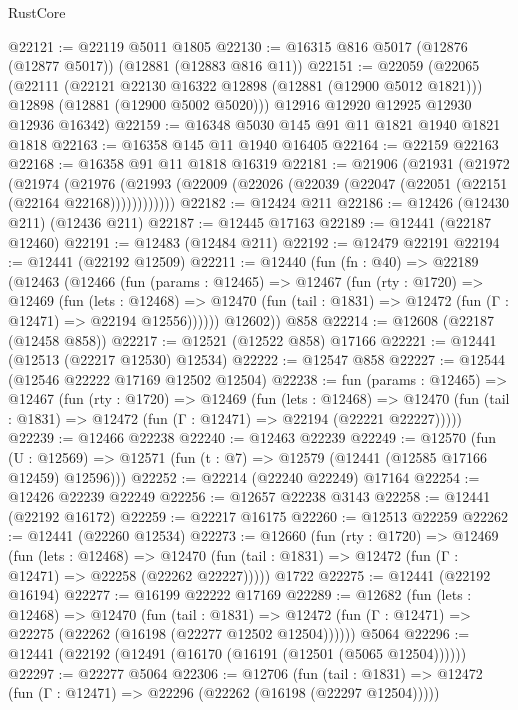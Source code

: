 \begin{lexlean}{RustCore}
\begin{coremodule}
@22121 := @22119 @5011 @1805
@22130 := @16315 @816 @5017 (@12876 (@12877 @5017)) (@12881 (@12883 @816 @11))
@22151 := @22059
    (@22065
      (@22111
        (@22121 @22130 @16322 @12898 (@12881 (@12900 @5012 @1821)))
        @12898
        (@12881 (@12900 @5002 @5020)))
      @12916
      @12920
      @12925
      @12930
      @12936
      @16342)
@22159 := @16348 @5030 @145 @91 @11 @1821 @1940 @1821 @1818
@22163 := @16358 @145 @11 @1940 @16405
@22164 := @22159 @22163
@22168 := @16358 @91 @11 @1818 @16319
@22181 := @21906
    (@21931
      (@21972
        (@21974
          (@21976 (@21993 (@22009 (@22026 (@22039 (@22047 (@22051 (@22151 (@22164 @22168))))))))))))
@22182 := @12424 @211
@22186 := @12426 (@12430 @211) (@12436 @211)
@22187 := @12445 @17163
@22189 := @12441 (@22187 @12460)
@22191 := @12483 (@12484 @211)
@22192 := @12479 @22191
@22194 := @12441 (@22192 @12509)
@22211 := @12440
    (fun (fn : @40) =>
    @22189
      (@12463
        (@12466
          (fun (params : @12465) =>
          @12467
            (fun (rty : @1720) =>
            @12469
              (fun (lets : @12468) =>
              @12470 (fun (tail : @1831) => @12472 (fun (Γ : @12471) => @22194 @12556))))))
        @12602))
    @858
@22214 := @12608 (@22187 (@12458 @858))
@22217 := @12521 (@12522 @858) @17166
@22221 := @12441 (@12513 (@22217 @12530) @12534)
@22222 := @12547 @858
@22227 := @12544 (@12546 @22222 @17169 @12502 @12504)
@22238 := fun (params : @12465) =>
  @12467
    (fun (rty : @1720) =>
    @12469
      (fun (lets : @12468) =>
      @12470 (fun (tail : @1831) => @12472 (fun (Γ : @12471) => @22194 (@22221 @22227)))))
@22239 := @12466 @22238
@22240 := @12463 @22239
@22249 := @12570
    (fun (U : @12569) => @12571 (fun (t : @7) => @12579 (@12441 (@12585 @17166 @12459) @12596)))
@22252 := @22214 (@22240 @22249) @17164
@22254 := @12426 @22239 @22249
@22256 := @12657 @22238 @3143
@22258 := @12441 (@22192 @16172)
@22259 := @22217 @16175
@22260 := @12513 @22259
@22262 := @12441 (@22260 @12534)
@22273 := @12660
    (fun (rty : @1720) =>
    @12469
      (fun (lets : @12468) =>
      @12470 (fun (tail : @1831) => @12472 (fun (Γ : @12471) => @22258 (@22262 @22227)))))
    @1722
@22275 := @12441 (@22192 @16194)
@22277 := @16199 @22222 @17169
@22289 := @12682
    (fun (lets : @12468) =>
    @12470
      (fun (tail : @1831) =>
      @12472 (fun (Γ : @12471) => @22275 (@22262 (@16198 (@22277 @12502 @12504))))))
    @5064
@22296 := @12441 (@22192 (@12491 (@16170 (@16191 (@12501 (@5065 @12504))))))
@22297 := @22277 @5064
@22306 := @12706
    (fun (tail : @1831) => @12472 (fun (Γ : @12471) => @22296 (@22262 (@16198 (@22297 @12504)))))

\end{coremodule}
\end{lexlean}
